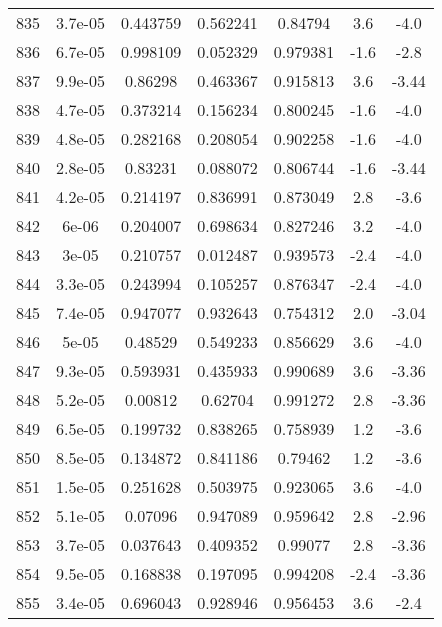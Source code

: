 \begin{table}
\begin{tabular}{c|c|c|c|c|c|c}
835 & 3.7e-05 & 0.443759 & 0.562241 & 0.84794 & 3.6 & -4.0\\
836 & 6.7e-05 & 0.998109 & 0.052329 & 0.979381 & -1.6 & -2.8\\
837 & 9.9e-05 & 0.86298 & 0.463367 & 0.915813 & 3.6 & -3.44\\
838 & 4.7e-05 & 0.373214 & 0.156234 & 0.800245 & -1.6 & -4.0\\
839 & 4.8e-05 & 0.282168 & 0.208054 & 0.902258 & -1.6 & -4.0\\
840 & 2.8e-05 & 0.83231 & 0.088072 & 0.806744 & -1.6 & -3.44\\
841 & 4.2e-05 & 0.214197 & 0.836991 & 0.873049 & 2.8 & -3.6\\
842 & 6e-06 & 0.204007 & 0.698634 & 0.827246 & 3.2 & -4.0\\
843 & 3e-05 & 0.210757 & 0.012487 & 0.939573 & -2.4 & -4.0\\
844 & 3.3e-05 & 0.243994 & 0.105257 & 0.876347 & -2.4 & -4.0\\
845 & 7.4e-05 & 0.947077 & 0.932643 & 0.754312 & 2.0 & -3.04\\
846 & 5e-05 & 0.48529 & 0.549233 & 0.856629 & 3.6 & -4.0\\
847 & 9.3e-05 & 0.593931 & 0.435933 & 0.990689 & 3.6 & -3.36\\
848 & 5.2e-05 & 0.00812 & 0.62704 & 0.991272 & 2.8 & -3.36\\
849 & 6.5e-05 & 0.199732 & 0.838265 & 0.758939 & 1.2 & -3.6\\
850 & 8.5e-05 & 0.134872 & 0.841186 & 0.79462 & 1.2 & -3.6\\
851 & 1.5e-05 & 0.251628 & 0.503975 & 0.923065 & 3.6 & -4.0\\
852 & 5.1e-05 & 0.07096 & 0.947089 & 0.959642 & 2.8 & -2.96\\
853 & 3.7e-05 & 0.037643 & 0.409352 & 0.99077 & 2.8 & -3.36\\
854 & 9.5e-05 & 0.168838 & 0.197095 & 0.994208 & -2.4 & -3.36\\
855 & 3.4e-05 & 0.696043 & 0.928946 & 0.956453 & 3.6 & -2.4\\
\end{tabular}
\end{table}
\newpage
